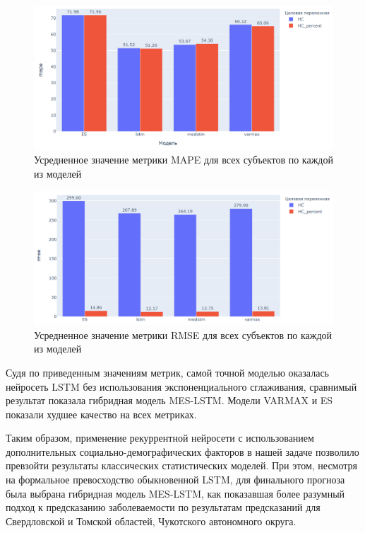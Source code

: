 \begin{figure}[th]
	\centering
	\includegraphics[width=1\textwidth]{images/mape_metric.png}
	\caption{Усредненное значение метрики MAPE для всех субъектов по каждой из моделей}
	\label{fig:mapemetric}
\end{figure}

\begin{figure}[th]
	\centering
	\includegraphics[width=1\textwidth]{images/rmse_metri}
	\caption{Усредненное значение метрики RMSE для всех субъектов по каждой из моделей}
	\label{fig:rmsemetric}
\end{figure}

Судя по приведенным значениям метрик, самой точной моделью оказалась нейросеть LSTM без использования экспоненциального сглаживания, сравнимый результат показала гибридная модель MES-LSTM. Модели VARMAX и ES показали худшее качество на всех метриках.

Таким образом, применение рекуррентной нейросети с использованием дополнительных социально-демографических факторов в нашей задаче позволило превзойти результаты классических статистических моделей. При этом, несмотря на формальное превосходство обыкновенной LSTM, для финального прогноза была выбрана гибридная модель MES-LSTM, как показавшая более разумный подход к предсказанию заболеваемости по результатам предсказаний для Свердловской и Томской областей, Чукотского автономного округа. 


